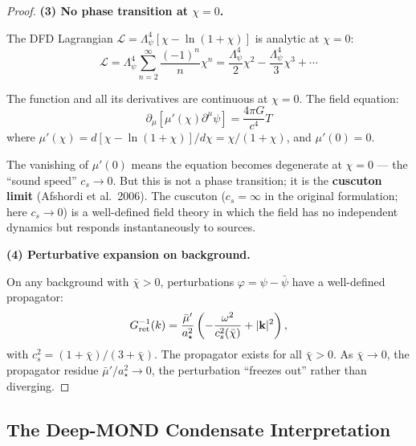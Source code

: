 \documentclass[11pt,a4paper]{article}
\begin{document}
\begin{proof}
\textbf{(3) No phase transition at $\chi = 0$.}

The DFD Lagrangian $\mathcal{L} = \Lambda_\psi^4[\chi - \ln(1+\chi)]$ is analytic at $\chi = 0$:
\begin{equation}
\mathcal{L} = \Lambda_\psi^4\sum_{n=2}^{\infty} \frac{(-1)^n}{n}\chi^n = \frac{\Lambda_\psi^4}{2}\chi^2 - \frac{\Lambda_\psi^4}{3}\chi^3 + \cdots
\end{equation}

The function and all its derivatives are continuous at $\chi = 0$. The field equation:
\begin{equation}
\partial_\mu\left[\mu'(\chi)\partial^\mu\psi\right] = \frac{4\pi G}{c^4}T
\end{equation}
where $\mu'(\chi) = d[\chi - \ln(1+\chi)]/d\chi = \chi/(1+\chi)$, and $\mu'(0) = 0$.

The vanishing of $\mu'(0)$ means the equation becomes degenerate at $\chi = 0$ --- the ``sound speed'' $c_s \to 0$. But this is not a phase transition; it is the \textbf{cuscuton limit} (Afshordi et al.\ 2006). The cuscuton ($c_s = \infty$ in the original formulation; here $c_s \to 0$) is a well-defined field theory in which the field has no independent dynamics but responds instantaneously to sources.

\textbf{(4) Perturbative expansion on background.}

On any background with $\bar\chi > 0$, perturbations $\varphi = \psi - \bar\psi$ have a well-defined propagator:
\begin{equation}
G_{\rm ret}^{-1}(k) = \frac{\bar\mu'}{a_\star^2}\left(-\frac{\omega^2}{c_s^2(\bar\chi)} + |\mathbf{k}|^2\right),
\end{equation}
with $c_s^2 = (1+\bar\chi)/(3+\bar\chi)$. The propagator exists for all $\bar\chi > 0$. As $\bar\chi \to 0$, the propagator residue $\bar\mu'/a_\star^2 \to 0$, the perturbation ``freezes out'' rather than diverging.
\end{proof}

\subsection{The Deep-MOND Condensate Interpretation}
\end{document}
